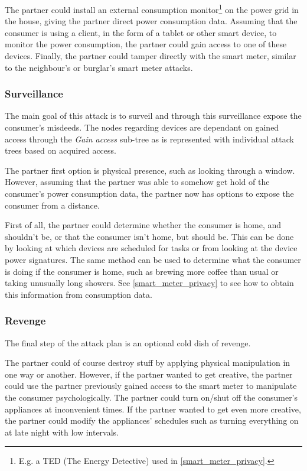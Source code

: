 The partner could install an external consumption monitor\footnote{E.g. a TED (The Energy Detective) used in \cref {smart_meter_privacy}.} on the power grid in the house, giving the partner direct power consumption data.
Assuming that the consumer is using a client, in the form of a tablet or other smart device, to monitor the power consumption, the partner could gain access to one of these devices.
Finally, the partner could tamper directly with the smart meter, similar to the neighbour's or burglar's smart meter attacks.

\subsubsection{Surveillance}
The main goal of this attack is to surveil and through this surveillance expose the consumer's misdeeds.
The nodes regarding devices are dependant on gained access through the \textit{Gain access} sub-tree as is represented with individual attack trees based on acquired access.

The partner first option is physical presence, such as looking through a window.
However, assuming that the partner was able to somehow get hold of the consumer's power consumption data, the partner now has options to expose the consumer from a distance.

First of all, the partner could determine whether the consumer is home, and shouldn't be, or that the consumer isn't home, but should be.
This can be done by looking at which devices are scheduled for tasks or from looking at the device power signatures.
The same method can be used to determine what the consumer is doing if the consumer is home, such as brewing more coffee than usual or taking unusually long showers.
See \cref{smart_meter_privacy} to see how to obtain this information from consumption data.

\subsubsection{Revenge}
The final step of the attack plan is an optional cold dish of revenge.

The partner could of course destroy stuff by applying physical manipulation in one way or another.
However, if the partner wanted to get creative, the partner could use the partner previously gained access to the smart meter to manipulate the consumer psychologically.
The partner could turn on/shut off the consumer's appliances at inconvenient times.
If the partner wanted to get even more creative, the partner could modify the appliances' schedules such as turning everything on at late night with low intervals.
